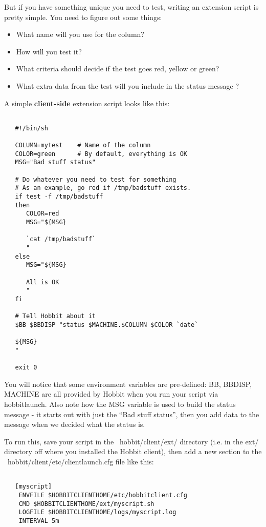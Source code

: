  But if you have something unique you need to test, writing an extension script is pretty simple. You need to figure out some things:
\begin{itemize}
\item What name will you use for the column? 
\item How will you test it? 
\item What criteria should decide if the test goes red, yellow or green? 
\item What extra data from the test will you include in the status message ? 

\end{itemize}


 A simple \textbf{client-side}
 extension script looks like this:
\begin{verbatim}

   #!/bin/sh

   COLUMN=mytest	# Name of the column
   COLOR=green		# By default, everything is OK
   MSG="Bad stuff status"

   # Do whatever you need to test for something
   # As an example, go red if /tmp/badstuff exists.
   if test -f /tmp/badstuff
   then
      COLOR=red
      MSG="${MSG}
 
      `cat /tmp/badstuff`
      "
   else
      MSG="${MSG}

      All is OK
      "
   fi

   # Tell Hobbit about it
   $BB $BBDISP "status $MACHINE.$COLUMN $COLOR `date`

   ${MSG}
   "

   exit 0

\end{verbatim}


 You will notice that some environment variables are pre-defined: BB, BBDISP, MACHINE are all provided by Hobbit when you run your script via hobbitlaunch. Also note how the MSG variable is used to build the status message - it starts out with just the ``Bad stuff status'', then you add data to the message when we decided what the status is.


 To run this, save your script in the ~hobbit/client/ext/ directory (i.e. in the ext/ directory off where you installed the Hobbit client), then add a new section to the ~hobbit/client/etc/clientlaunch.cfg file like this:
\begin{verbatim}

   [myscript]
	ENVFILE $HOBBITCLIENTHOME/etc/hobbitclient.cfg
	CMD $HOBBITCLIENTHOME/ext/myscript.sh
	LOGFILE $HOBBITCLIENTHOME/logs/myscript.log
	INTERVAL 5m

\end{verbatim}
 
